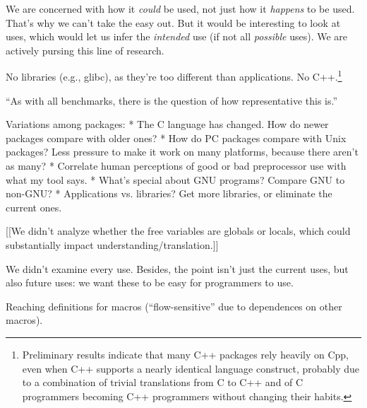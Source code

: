 \documentclass[10pt]{article}
\newcommand{\pkg}[1]{\textsf{#1}}
\begin{document}
  We are concerned with how it {\em could} be used, not just how it {\em
  happens} to be used.  That's why we can't take the easy out.  But it
  would be interesting to look at uses, which would let us infer the {\em
  intended} use (if not all {\em possible} uses).  We are actively pursing
  this line of research.


No libraries (e.g., \pkg{glibc}), as they're too different than applications.
No C++.\footnote{Preliminary results indicate that many
  C++ packages rely heavily on Cpp, even when C++ supports a nearly
  identical language construct, probably due to a combination of trivial
  translations from C to C++ and of C programmers becoming C++ programmers
  without changing their habits.}

``As with all benchmarks, there is the question of how representative this is.''

Variations among packages:
 * The C language has changed.  How do newer packages compare with older ones?
 * How do PC packages compare with Unix packages?  Less pressure to make it
   work on many platforms, because there aren't as many?
 * Correlate human perceptions of good or bad preprocessor use with what my
   tool says.
 * What's special about GNU programs?  Compare GNU to non-GNU?
 * Applications vs. libraries?  Get more libraries, or eliminate the current
   ones.


  [[We didn't analyze whether the free variables are globals or locals,
          which could substantially impact understanding/translation.]]

        We didn't examine every use.  Besides, the point isn't just the
          current uses, but also future uses:  we want these to be easy for
          programmers to use.
          
Reaching definitions for macros (``flow-sensitive'' due to
dependences on other macros).

{\small }
\end{document}
